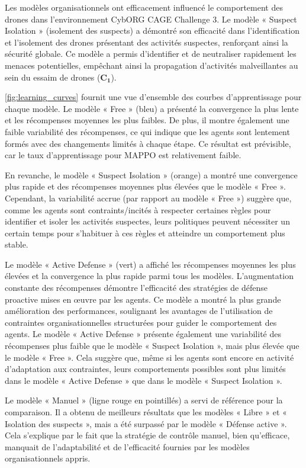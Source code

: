 Les modèles organisationnels ont efficacement influencé le comportement des drones dans l'environnement CybORG CAGE Challenge 3. Le modèle « Suspect Isolation » (isolement des suspects) a démontré son efficacité dans l'identification et l'isolement des drones présentant des activités suspectes, renforçant ainsi la sécurité globale. Ce modèle a permis d'identifier et de neutraliser rapidement les menaces potentielles, empêchant ainsi la propagation d'activités malveillantes au sein du essaim de drones ($\mathbf{C_1}$).

\autoref{fig:learning_curves} fournit une vue d'ensemble des courbes d'apprentissage pour chaque modèle. Le modèle « Free » (bleu) a présenté la convergence la plus lente et les récompenses moyennes les plus faibles. De plus, il montre également une faible variabilité des récompenses, ce qui indique que les agents sont lentement formés avec des changements limités à chaque étape. Ce résultat est prévisible, car le taux d'apprentissage pour MAPPO est relativement faible.

En revanche, le modèle « Suspect Isolation » (orange) a montré une convergence plus rapide et des récompenses moyennes plus élevées que le modèle « Free ». Cependant, la variabilité accrue (par rapport au modèle « Free ») suggère que, comme les agents sont contraints/incités à respecter certaines règles pour identifier et isoler les activités suspectes, leurs politiques peuvent nécessiter un certain temps pour s'habituer à ces règles et atteindre un comportement plus stable.

Le modèle « Active Defense » (vert) a affiché les récompenses moyennes les plus élevées et la convergence la plus rapide parmi tous les modèles. L'augmentation constante des récompenses démontre l'efficacité des stratégies de défense proactive mises en œuvre par les agents. Ce modèle a montré la plus grande amélioration des performances, soulignant les avantages de l'utilisation de contraintes organisationnelles structurées pour guider le comportement des agents. Le modèle « Active Defense » présente également une variabilité des récompenses plus faible que le modèle « Suspect Isolation », mais plus élevée que le modèle « Free ». Cela suggère que, même si les agents sont encore en activité d'adaptation aux contraintes, leurs comportements possibles sont plus limités dans le modèle « Active Defense » que dans le modèle « Suspect Isolation ».

Le modèle « Manuel » (ligne rouge en pointillés) a servi de référence pour la comparaison. Il a obtenu de meilleurs résultats que les modèles « Libre » et « Isolation des suspects », mais a été surpassé par le modèle « Défense active ». Cela s'explique par le fait que la stratégie de contrôle manuel, bien qu'efficace, manquait de l'adaptabilité et de l'efficacité fournies par les modèles organisationnels appris.

